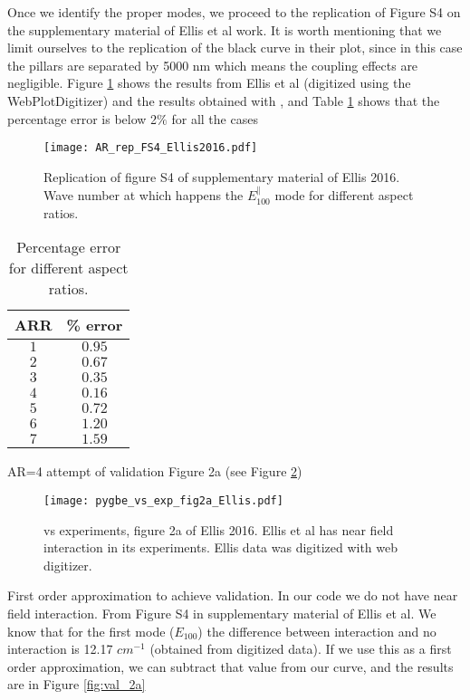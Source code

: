 Once we identify the proper modes, we proceed to the replication of Figure S4 on the 
supplementary material of Ellis et al work. It is worth mentioning that we limit ourselves to
the replication of the black curve in their plot, since in this case the pillars are separated 
by 5000 nm which means the coupling effects are negligible. Figure \ref{fig:rep_FS4_ellis} shows
the results from  Ellis et al (digitized using the WebPlotDigitizer) and the results obtained
with \pygbe, and Table \ref{tab:err_AR} shows that the percentage error is below 2$\%$ for all
the cases


\begin{figure}
    \centering
    \texttt{[image: AR\_rep\_FS4\_Ellis2016.pdf]} 
    \caption{Replication of figure S4 of supplementary material of Ellis 2016. Wave
    number at which happens the $E^{\parallel}_{100}$ mode for different aspect ratios.}
    \label{fig:rep_FS4_ellis}
 \end{figure}
 
 \begin{table}
    \centering
    \label{tab:err_AR}
    \caption{Percentage error for different aspect ratios.} 
    \begin{tabular}{c c}
    \hline%
    ARR & \% error \\
    \hline%
     $1$ & $0.95$ \\
     $2$ & $0.67$ \\
     $3$ & $0.35$ \\
     $4$ & $0.16$ \\
     $5$ & $0.72$ \\
     $6$ & $1.20$ \\
     $7$ & $1.59$ \\
    \hline%
    \end{tabular}
\end{table}


\pygbe AR=4 attempt of validation Figure 2a (see Figure \ref{fig:pygbe_vs_exp_2a})

\begin{figure}
    \centering
    \texttt{[image: pygbe\_vs\_exp\_fig2a\_Ellis.pdf]} 
    \caption{\pygbe vs experiments, figure 2a of Ellis 2016. Ellis et al 
    has near field interaction in its experiments. Ellis data was digitized
    with web digitizer.}
    \label{fig:pygbe_vs_exp_2a}
 \end{figure}

First order approximation to achieve validation. In our code we do not have near 
field interaction. From Figure S4 in supplementary material of Ellis et al. We know that 
for the first mode ($E_{100}$) the difference between interaction and no interaction is 
12.17 $cm^{-1}$ (obtained from digitized data). If we use this as a first order approximation,
we can subtract that value from our curve, and the results are in Figure \ref{fig:val_2a}

